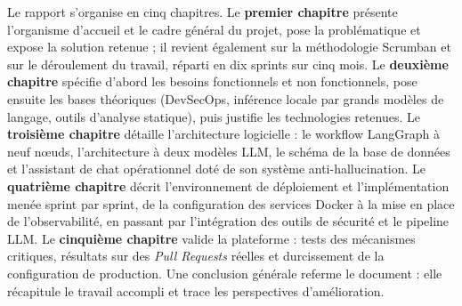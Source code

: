 Le rapport s'organise en cinq chapitres. Le \textbf{premier chapitre} présente
l'organisme d'accueil et le cadre général du projet, pose la problématique et expose
la solution retenue ; il revient également sur la méthodologie Scrumban et sur le
déroulement du travail, réparti en dix sprints sur cinq mois. Le \textbf{deuxième
chapitre} spécifie d'abord les besoins fonctionnels et non fonctionnels, pose ensuite
les bases théoriques (DevSecOps, inférence locale par grands modèles de langage,
outils d'analyse statique), puis justifie les technologies retenues. Le
\textbf{troisième chapitre} détaille l'architecture logicielle : le workflow LangGraph
à neuf nœuds, l'architecture à deux modèles LLM, le schéma de la base de données et
l'assistant de chat opérationnel doté de son système anti-hallucination. Le
\textbf{quatrième chapitre} décrit l'environnement de déploiement et l'implémentation
menée sprint par sprint, de la configuration des services Docker à la mise en place de
l'observabilité, en passant par l'intégration des outils de sécurité et le pipeline
LLM. Le \textbf{cinquième chapitre} valide la plateforme : tests des mécanismes
critiques, résultats sur des \textit{Pull Requests} réelles et durcissement de la
configuration de production. Une conclusion générale referme le document : elle
récapitule le travail accompli et trace les perspectives d'amélioration.
